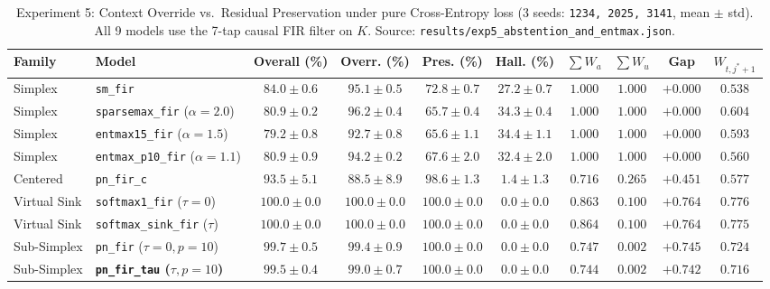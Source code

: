 \documentclass[11pt,a4paper]{article}
\begin{document}
\begin{table}[ht!]
\centering
\caption{Experiment 5: Context Override vs.\ Residual Preservation under pure Cross-Entropy loss (3 seeds: \texttt{1234, 2025, 3141}, mean $\pm$ std). All 9 models use the 7-tap causal FIR filter on $K$. Source: \texttt{results/exp5\_abstention\_and\_entmax.json}.}
\label{tab:exp5}
\scriptsize
\setlength{\tabcolsep}{2.2pt}
\begin{tabular}{llcccccccc}
\toprule
Family & Model & Overall (\%) & Overr. (\%) & Pres. (\%) & Hall. (\%) & $\sum W_a$ & $\sum W_u$ & Gap & $W_{t, j^*+1}$ \\
\midrule
Simplex & \texttt{sm\_fir} & $84.0 \pm 0.6$ & $95.1 \pm 0.5$ & $72.8 \pm 0.7$ & $\mathbf{27.2 \pm 0.7}$ & $1.000$ & $1.000$ & $+0.000$ & $0.538$ \\
Simplex & \texttt{sparsemax\_fir} ($\alpha=2.0$) & $80.9 \pm 0.2$ & $96.2 \pm 0.4$ & $65.7 \pm 0.4$ & $\mathbf{34.3 \pm 0.4}$ & $1.000$ & $1.000$ & $+0.000$ & $0.604$ \\
Simplex & \texttt{entmax15\_fir} ($\alpha=1.5$) & $79.2 \pm 0.8$ & $92.7 \pm 0.8$ & $65.6 \pm 1.1$ & $\mathbf{34.4 \pm 1.1}$ & $1.000$ & $1.000$ & $+0.000$ & $0.593$ \\
Simplex & \texttt{entmax\_p10\_fir} ($\alpha=1.1$) & $80.9 \pm 0.9$ & $94.2 \pm 0.2$ & $67.6 \pm 2.0$ & $\mathbf{32.4 \pm 2.0}$ & $1.000$ & $1.000$ & $+0.000$ & $0.560$ \\
\midrule
Centered & \texttt{pn\_fir\_c} & $93.5 \pm 5.1$ & $88.5 \pm 8.9$ & $98.6 \pm 1.3$ & $1.4 \pm 1.3$ & $0.716$ & $0.265$ & $+0.451$ & $0.577$ \\
Virtual Sink & \texttt{softmax1\_fir} ($\tau=0$) & $\mathbf{100.0 \pm 0.0}$ & $\mathbf{100.0 \pm 0.0}$ & $\mathbf{100.0 \pm 0.0}$ & $\mathbf{0.0 \pm 0.0}$ & $0.863$ & $0.100$ & $+0.764$ & $0.776$ \\
Virtual Sink & \texttt{softmax\_sink\_fir} ($\tau$) & $\mathbf{100.0 \pm 0.0}$ & $\mathbf{100.0 \pm 0.0}$ & $\mathbf{100.0 \pm 0.0}$ & $\mathbf{0.0 \pm 0.0}$ & $0.864$ & $0.100$ & $+0.764$ & $0.775$ \\
Sub-Simplex & \texttt{pn\_fir} ($\tau=0, p=10$) & $99.7 \pm 0.5$ & $99.4 \pm 0.9$ & $\mathbf{100.0 \pm 0.0}$ & $\mathbf{0.0 \pm 0.0}$ & $0.747$ & $\mathbf{0.002}$ & $+0.745$ & $0.724$ \\
Sub-Simplex & \textbf{\texttt{pn\_fir\_tau} ($\tau, p=10$)} & $\mathbf{99.5 \pm 0.4}$ & $\mathbf{99.0 \pm 0.7}$ & $\mathbf{100.0 \pm 0.0}$ & $\mathbf{0.0 \pm 0.0}$ & $0.744$ & $\mathbf{0.002}$ & $\mathbf{+0.742}$ & $0.716$ \\
\bottomrule
\end{tabular}
\end{table}
\end{document}
